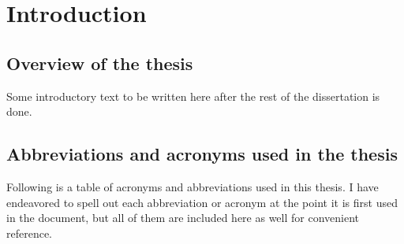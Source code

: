 \chapter{Introduction}
\section[Overview]{Overview of the thesis \label{sec:Overview}}
Some introductory text to be written here after the rest of the dissertation is done.

\section[Abbreviations \& acronyms]{Abbreviations and acronyms used in the thesis \label{sec:Abbr}}
Following is a table of acronyms and abbreviations used in this thesis.  I have endeavored to spell out each abbreviation or acronym at the point it is first used in the document, but all of them are included here as well for convenient reference.

